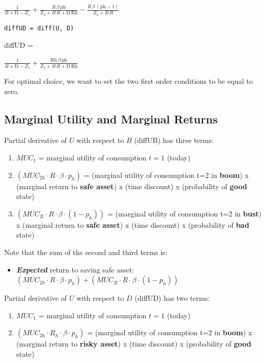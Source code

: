 \documentclass[
]{book}
\providecommand{\tightlist}{%
  \setlength{\itemsep}{0pt}\setlength{\parskip}{0pt}}
\begin{document}
\(\displaystyle \frac{1}{B+\textrm{D}-Z_1 }+\frac{R\,\beta \,\textrm{ph}}{Z_2 +B\,R+\textrm{D}\,\textrm{Rh}}-\frac{R\,\beta \,{\left(\textrm{ph}-1\right)}}{Z_2 +B\,R}\)

\begin{verbatim}
diffUD = diff(U, D)
\end{verbatim}

diffUD =

\(\displaystyle \frac{1}{B+\textrm{D}-Z_1 }+\frac{\textrm{Rh}\,\beta \,\textrm{ph}}{Z_2 +B\,R+\textrm{D}\,\textrm{Rh}}\)

For optimal choice, we want to set the two first order conditions to be
equal to zero.

\hypertarget{marginal-utility-and-marginal-returns}{%
\subsection{Marginal Utility and Marginal Returns}\label{marginal-utility-and-marginal-returns}}

Partial derivative of \(U\) with respect to \(B\) (diffUB) has three terms:

\begin{enumerate}
\def\labelenumi{\arabic{enumi}.}
\item
  \(MUC_1\) = marginal utility of consumption \(t=1\) (today)
\item
  \((MUC_{2h} \cdot R\cdot \beta \cdot p_h )\) = (marginal utility of
  consumption t=2 in \textbf{boom}) x (marginal return to \textbf{safe asset}) x
  (time discount) x (probability of \textbf{good} state)
\item
  \((MUC_{2l} \cdot R\cdot \beta \cdot (1-p_h ))\) = (marginal utility
  of consumption t=2 in \textbf{bust}) x (marginal return to \textbf{safe
  asset}) x (time discount) x (probability of \textbf{bad} state)
\end{enumerate}

Note that the sum of the second and third terms is:

\begin{itemize}
\tightlist
\item
  \textbf{\emph{Expected}} return to saving safe asset:
  \((MUC_{2h} \cdot R\cdot \beta \cdot p_h )+(MUC_{2l} \cdot R\cdot \beta \cdot (1-p_h ))\)
\end{itemize}

Partial derivative of \(U\) with respect to \(D\) (diffUD) has two terms:

\begin{enumerate}
\def\labelenumi{\arabic{enumi}.}
\item
  \(MUC_1\) = marginal utility of consumption \(t=1\) (today)
\item
  \((MUC_{2h} \cdot R_h \cdot \beta \cdot p_h )\) = (marginal utility of
  consumption t=2 in \textbf{boom}) x (marginal return to \textbf{risky asset})
  x (time discount) x (probability of \textbf{good} state)
\end{enumerate}
\end{document}
